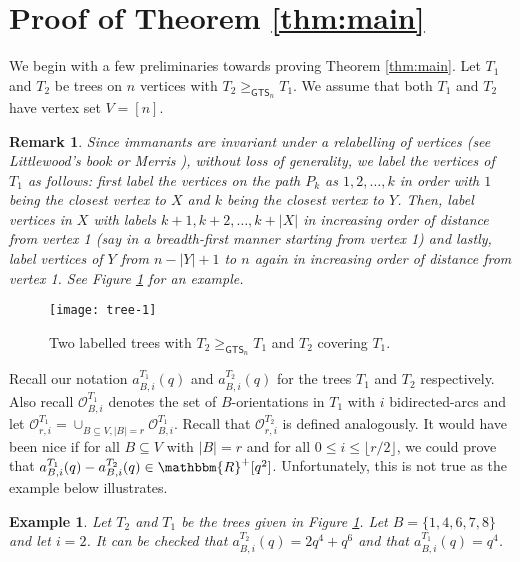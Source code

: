 \documentclass[12pt]{article}
\newtheorem{example}[theorem]{Example}
\newtheorem{remark}[theorem]{Remark}
\newcommand{\sO}{  \mathcal{ O}}
\newcommand{\RR}{ \mathbbm{R}}
\newcommand{\rhalf}{\lfloor r/2 \rfloor}
\newcommand{\GTS}{\mathsf{GTS}}
\begin{document}
\section{Proof of Theorem \ref{thm:main} }
\label{sec:coeff_imman_poly}




We begin with a few preliminaries towards proving Theorem \ref{thm:main}.
Let $T_1$ and $T_2$ be trees on $n$ vertices with $T_2 \geq_{\GTS_n} T_1$.  We 
assume that both $T_1$ and $T_2$ have vertex set  $V=[n]$.

\begin{remark}
  \label{rem:label}
Since immanants are invariant under a relabelling of vertices 
(see Littlewood's book \cite{littlewood-book} or Merris
\cite{merris-immanantal_invariants}),
without loss of generality, we label the vertices of $T_1$ as follows:
first label the vertices on the path $P_k$ as $1,2,\ldots, k$ in order with 
$1$ being the closest vertex to $X$ and $k$ being the closest vertex 
to $Y$.   Then, 
label vertices in $X$ with labels $k+1, k+2, \ldots, k+|X|$ in increasing order 
of distance from vertex 1 (say in a breadth-first manner starting from vertex 1) 
and lastly, label vertices of $Y$ from $n-|Y|+1$ to $n$ again in increasing order
of distance from vertex 1.  See Figure 
\ref{fig:gts_label_example} for an example.
\end{remark}


\begin{figure}[h]
\centerline{\texttt{[image: tree-1]}}
\caption{Two labelled trees with $T_2 \geq_{\GTS_n} T_1$ and $T_2$ covering $T_1$.}
\label{fig:gts_label_example}
\end{figure}


Recall our notation 
$a_{B,i}^{T_1}(q)$ and $a_{B,i}^{T_2}(q)$ for the trees $T_1$ and $T_2$ respectively.
Also recall $\sO_{B,i}^{T_1}$ denotes the set 
of $B$-orientations in $T_1$ with
$i$ bidirected-arcs and let $\sO_{r,i}^{T_1} = \cup_{B \subseteq V, |B|=r}^{ } \sO_{B,i}^{T_1}$. 
Recall that $\sO_{r,i}^{T_2}$ is defined analogously. 
It would have been nice if for all $B \subseteq V$ with $|B| = r$ and for 
all $0 \leq i \leq \rhalf$, we could prove that $a_{B,i}^{T_1}(q) - a_{B,i}^{T_2}(q)
\in \RR^+[q^2]$.  Unfortunately, this is not true as the example below
illustrates.

\begin{example}
  Let $T_2$ and $T_1$ be the trees given in Figure 
\ref{fig:gts_label_example}.  Let
  $B = \{1,4,6,7,8\}$ and let $i=2$.  It can be checked that 
  $a_{B,i}^{T_2}(q) = 2q^4+q^6$ and that $a_{B,i}^{T_1}(q) = q^4$.
\end{example}
\end{document}
